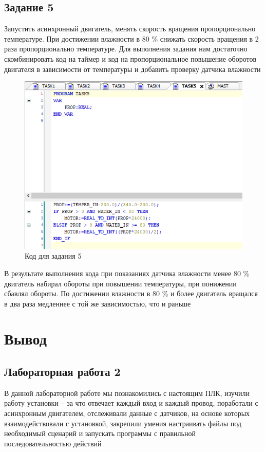 \documentclass[a4paper, 16pt]{article}
\begin{document}
    \subsection{Задание 5}
    \noindent Запустить асинхронный двигатель, менять скорость вращения пропорционально температуре. При
    достижении влажности в 80 \% снижать скорость вращения в 2 раза пропорционально температуре. Для выполнения
    задания нам достаточно скомбинировать код на таймер и код на пропорциональное повышение оборотов двигателя в зависимости
    от температуры и добавить проверку датчика влажности
    \begin{figure}[h!]
        \centering
        \includegraphics[scale=0.8]{t5.png}
        \captionsetup{skip=0pt}
        \caption{Код для задания 5}
        \label{Рис:9}
    \end{figure}


    \noindent В результате выполнения кода при показаниях датчика влажности менее 80 \% двигатель набирал обороты
    при повышении температуры, при понижении сбавлял обороты. По достижении влажности в 80 \% и более двигатель вращался
    в два раза медленнее с той же зависимостью, что и раньше


    \newpage
    \section{Вывод}
    \subsection{Лабораторная работа 2}
    \noindent В данной лабораторной работе мы познакомились с настоящим ПЛК, изучили работу установки -- за что отвечает
    каждый вход и каждый провод, поработали с асинхронным двигателем, отслеживали данные с датчиков, на основе которых взаимодействовали с установкой,
    закрепили умения настраивать файлы под необходимый сценарий и запускать программы с правильной последовательностью действий
\end{document}
